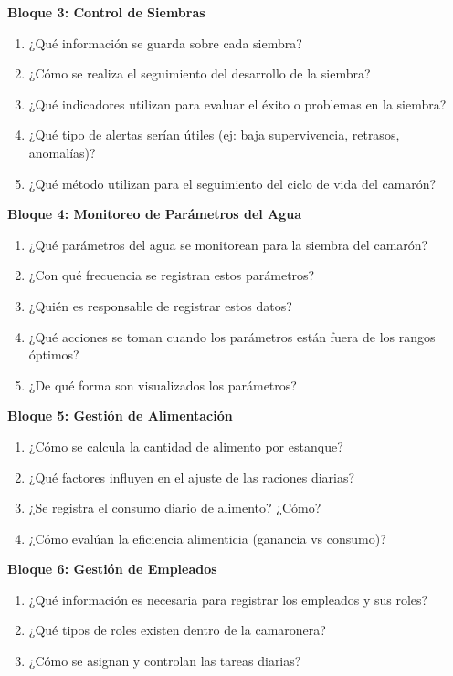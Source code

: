 \documentclass[11pt,a4paper]{article}
\begin{document}
\noindent\textbf{Bloque 3: Control de Siembras}
\begin{enumerate}[resume]
  \item ¿Qué información se guarda sobre cada siembra?
  \item ¿Cómo se realiza el seguimiento del desarrollo de la siembra?
  \item ¿Qué indicadores utilizan para evaluar el éxito o problemas en la siembra?
  \item ¿Qué tipo de alertas serían útiles (ej: baja supervivencia, retrasos, anomalías)?
  \item ¿Qué método utilizan para el seguimiento del ciclo de vida del camarón?
\end{enumerate}

\noindent\textbf{Bloque 4: Monitoreo de Parámetros del Agua}
\begin{enumerate}[resume]
  \item ¿Qué parámetros del agua se monitorean para la siembra del camarón?
  \item ¿Con qué frecuencia se registran estos parámetros?
  \item ¿Quién es responsable de registrar estos datos?
  \item ¿Qué acciones se toman cuando los parámetros están fuera de los rangos óptimos?
  \item ¿De qué forma son visualizados los parámetros?
\end{enumerate}

\noindent\textbf{Bloque 5: Gestión de Alimentación}
\begin{enumerate}[resume]
  \item ¿Cómo se calcula la cantidad de alimento por estanque?
  \item ¿Qué factores influyen en el ajuste de las raciones diarias?
  \item ¿Se registra el consumo diario de alimento? ¿Cómo?
  \item ¿Cómo evalúan la eficiencia alimenticia (ganancia vs consumo)?
\end{enumerate}

\noindent\textbf{Bloque 6: Gestión de Empleados}
\begin{enumerate}[resume]
  \item ¿Qué información es necesaria para registrar los empleados y sus roles?
  \item ¿Qué tipos de roles existen dentro de la camaronera?
  \item ¿Cómo se asignan y controlan las tareas diarias?
\end{enumerate}
\end{document}
